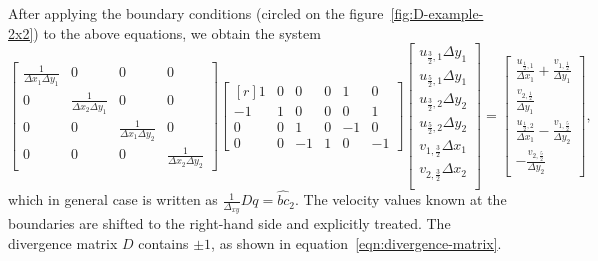 \documentclass{article}
\begin{document}
After applying the boundary conditions (circled on the figure~\ref{fig:D-example-2x2}) to the above equations, we obtain the system%
\begin{equation}\label{eqn:divergence-matrix}
	\begin{bmatrix}{}
		\frac{1}{\Delta x_1\Delta y_1}		&0	&0	&0\\
		0		&\frac{1}{\Delta x_2\Delta y_1}	&0	&0\\
		0		&0	&\frac{1}{\Delta x_1\Delta y_2}	&0\\
		0		&0	&0	&\frac{1}{\Delta x_2\Delta y_2}
	\end{bmatrix}
	\begin{bmatrix*}[r]{}
		1	&0	&0	&0	&1	&0\\
		-1	&1	&0	&0	&0	&1\\
		0	&0	&1	&0	&-1	&0\\
		0	&0	&-1	&1	&0	&-1
	\end{bmatrix*}
	\begin{bmatrix}{}
	u_{\frac{3}{2},1}	\Delta y_1\\
	u_{\frac{5}{2},1}	\Delta y_1\\
	u_{\frac{3}{2},2}	\Delta y_2\\
	u_{\frac{5}{2},2}	\Delta y_2\\
	v_{1,\frac{3}{2}}	\Delta x_1\\
	v_{2,\frac{3}{2}}	\Delta x_2\\
	\end{bmatrix}
	=
	\begin{bmatrix}{}
	\frac{u_{\frac{1}{2},1}}{\Delta x_1}+	\frac{v_{1,\frac{1}{2}}}{\Delta y_1}\\
	\frac{v_{2,\frac{1}{2}}}{\Delta y_1}	\\
	\frac{u_{\frac{1}{2},2}}{\Delta x_1} -	\frac{v_{1,\frac{5}{2}}}{\Delta y_2}\\
	-\frac{v_{2,\frac{5}{2}}}{\Delta y_2}
	\end{bmatrix},
\end{equation}
which in general case is written as 
$\frac{1}{\Delta_{xy}} D q=\hat{bc}_2$.
The velocity values known at the boundaries are shifted to the right-hand side and explicitly treated. The divergence matrix $D$ contains $\pm1$, as shown in equation~\eqref{eqn:divergence-matrix}.

\end{document}

